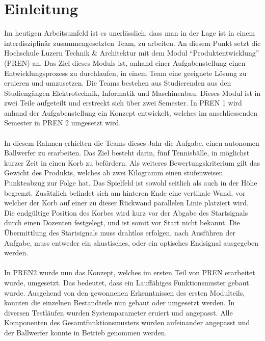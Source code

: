 \section{Einleitung}
Im heutigen Arbeitsumfeld ist es unerlässlich, dass man in der Lage ist in 
einem interdisziplinär zusammengesetzten Team, zu arbeiten. An diesem Punkt 
setzt die Hochschule Luzern Technik \& Architektur mit dem Modul 
\enquote{Produktentwicklung} (PREN) an. Das Ziel dieses Moduls ist, anhand 
einer Aufgabenstellung einen Entwicklungsprozess zu durchlaufen, in einem 
Team eine geeignete Lösung zu eruieren und umzusetzen. Die Teams bestehen 
aus Studierenden aus den Studiengängen Elektrotechnik, Informatik und 
Maschinenbau. Dieses Modul ist in zwei Teile aufgeteilt und erstreckt sich 
über zwei Semester. In PREN 1 wird anhand der Aufgabenstellung ein Konzept 
entwickelt, welches im anschliessenden Semester in PREN 2 umgesetzt wird.\\
\\
In diesem Rahmen erhielten die Teams dieses Jahr die Aufgabe, einen autonomen 
Ballwerfer zu erarbeiten. Das Ziel besteht darin, fünf Tennisbälle, in möglichst 
kurzer Zeit in einen Korb zu befördern. Als weiteres Bewertungskriterium gilt 
das Gewicht des Produkts, welches ab zwei Kilogramm einen stufenweisen 
Punkteabzug zur Folge hat. Das Spielfeld ist sowohl seitlich als auch in der 
Höhe begrenzt. Zusätzlich befindet sich am hinteren Ende eine vertikale Wand, 
vor welcher der Korb auf einer zu dieser Rückwand parallelen Linie platziert 
wird. Die endgültige Position des Korbes wird kurz vor der Abgabe des Startsignals 
durch einen Dozenten festgelegt, und ist somit vor Start nicht bekannt. Die 
Übermittlung des Startsignals muss drahtlos erfolgen, nach Ausführen der Aufgabe, 
muss entweder ein akustisches, oder ein optisches Endsignal ausgegeben werden.\\
\\
In PREN2 wurde nun das Konzept, welches im ersten Teil von PREN erarbeitet wurde, 
umgesetzt. Das bedeutet, dass ein Lauffähiges Funktionsmuster gebaut wurde. 
Ausgehend von den gewonnenen Erkenntnissen des ersten Modulteils, konnten die 
einzelnen Bestandteile nun gebaut oder umgesetzt werden. In diversen Testläufen 
wurden Systemparameter eruiert und angepasst. Alle Komponenten des 
Gesamtfunktionsmusters wurden aufeinander angepasst und der Ballwerfer konnte in 
Betrieb genommen werden. 